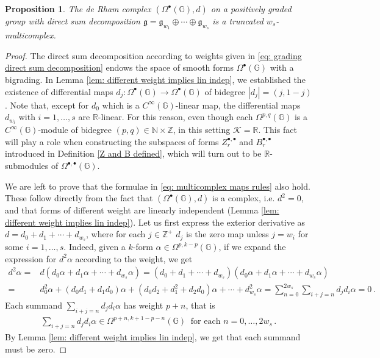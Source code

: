 \documentclass[dvipsnames]{amsart}
\newtheorem{proposition}[theorem]{Proposition}
\theoremstyle{definition}
\theoremstyle{definition}
\numberwithin{equation}{section}
\newcommand{\R}{\mathbb{R}}
\newcommand{\N}{\mathbb{N}}
\newcommand{\Z}{\mathbb{Z}}
\newcommand{\G}{\mathbb{G}}
\begin{document}
\begin{proposition}\label{prop: de Rham is multicomplex} The de Rham complex $(\Omega^\bullet(\G),d)$ on a positively graded group with direct sum decomposition $\mathfrak{g}=\mathfrak{g}_{w_1}\oplus\cdots\oplus\mathfrak{g}_{w_s}$ is a truncated $w_s$-multicomplex.
\end{proposition}
\begin{proof}
    The direct sum decomposition according to weights given in \eqref{eq: grading direct sum decomposition} endows the space of smooth forms $\Omega^\bullet(\G)$ with a bigrading. In Lemma \ref{lem: different weight implies lin indep}, we established the existence of differential maps $d_{j}\colon\Omega^\bullet(\G)\to\Omega^\bullet(\G)$ of bidegree $|d_{j}|=(j,1-j)$. Note that, except for $d_0$ which is a $C^\infty(\G)$-linear map, the differential maps $d_{w_i}$ with $i=1,\ldots,s$ are $\R$-linear. For this reason, even though each $\Omega^{p,q}(\G)$ is a $C^\infty(\G)$-module of bidegree $(p,q)\in\N\times\Z$, in this setting $\mathcal{K}=\R$. This fact will play a role when constructing the subspaces of forms $Z_r^{\bullet,\bullet}$ and $B_r^{\bullet,\bullet}$ introduced in Definition \ref{Z and B defined}, which will turn out to be $\R$-submodules of $\Omega^{\bullet,\bullet}(\G)$. 
    
    We are left to prove that the formulae in \eqref{eq: multicomplex maps rules} also hold.
    These follow directly from the fact that $(\Omega^\bullet(\G),d)$ is a complex, i.e. $d^2=0$, and that forms of different weight are linearly independent (Lemma \ref{lem: different weight implies lin indep}).  
Let us first express the exterior derivative as $d=d_0+d_1+\cdots+d_{w_s}$, where for each $j\in\Z^+$ $d_j$ is the zero map unless $j= w_{i}$ for some $i=1,\ldots,s$.
    Indeed, given a $k$-form $\alpha\in\Omega^{p,k-p}(\G)$, if we expand the expression for $d^2\alpha$ according to the weight, we get
    \begin{align*}
        d^2\alpha=&d\left(d_0\alpha+d_{1}\alpha+\cdots+d_{w_s}\alpha\right)=(d_0+d_{1}+\cdots+d_{w_s})\left(d_0\alpha+d_{1}\alpha+\cdots+d_{w_s}\alpha\right)\\=&d_0^2\alpha+\left(d_0d_{1}+d_{1}d_0\right)\alpha+\left(d_0d_2+d_1^2+d_2d_0\right)\alpha+\cdots+d_{w_s}^2\alpha=\sum_{n=0}^{2w_s}\sum_{i+j=n}d_jd_i\alpha=0\,.
    \end{align*}
    Each summand $\sum_{i+j=n}d_jd_i\alpha$ has weight $p+n$, that is
    \begin{align*}
        \sum_{i+j=n}d_jd_i\alpha\in\Omega^{p+n,k+1-p-n}(\G)\ \text{ for each }n=0,\ldots,2w_s\,.
    \end{align*}
    By Lemma \ref{lem: different weight implies lin indep}, we get that each summand must be zero.
\end{proof}
\end{document}
